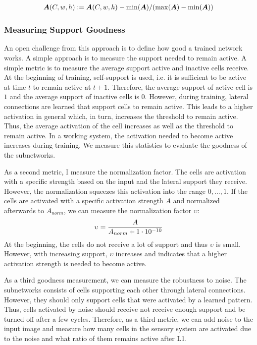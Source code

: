 \begin{align}\eqlbl{norm_lat3}
	\boldsymbol{A}(C,w,h) :=  \boldsymbol{A}(C,w,h)  - \min(\boldsymbol{A}) / (\max(\boldsymbol{A}) - \min(\boldsymbol{A}))
\end{align}


\subsubsection{Measuring Support Goodness}
An open challenge from this approach is to define how good a trained network works.
A simple approach is to measure the support needed to remain active.
A simple metric is to measure the average support active and inactive cells receive.
At the beginning of training, self-support is used, i.e. it is sufficient to be active at time $t$ to remain active at $t+1$.
Therefore, the average support of active cell is $1$ and the average support of inactive cells is $0$.
However, during training, lateral connections are learned that support cells to remain active.
This leads to a higher activation in general which, in turn, increases the threshold to remain active.
Thus, the average activation of the cell increases as well as the threshold to remain active.
In a working system, the activation needed to become active increases during training.
We measure this statistics to evaluate the goodness of the subnetworks.

As a second metric, I measure the normalization factor.
The cells are activation with a specific strength based on the input and the lateral support they receive.
However, the normalization squeezes this activation into the range $0, ..., 1$.
If the cells are activated with a specific activation strength $A$ and normalized afterwards to $A_{norm}$, we can measure the normalization factor 
$\upsilon$:
\begin{align}\eqlbl{goodness_lat}
	\upsilon = \frac{A}{A_{norm}+1\cdot10^{-10}}
\end{align}
At the beginning, the cells do not receive a lot of support and thus $\upsilon$ is small. However, with increasing support, $\upsilon$ increases and indicates that a higher activation strength is needed to become active.

As a third goodness measurement, we can measure the robustness to noise.
The subnetworks consists of cells supporting each other through lateral connections. However, they should only support cells that were activated by a learned pattern. Thus, cells activated by noise should receive not receive enough support and be turned off after a few cycles.
Therefore, as a third metric, we can add noise to the input image and measure how many cells  in the sensory system are activated due to the noise and what ratio of them remains active after L1.


